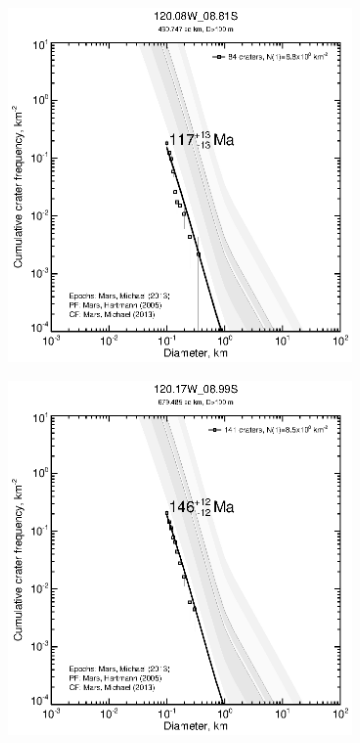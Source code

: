 \documentclass[12pt,letter]{article}
\begin{document}
\begin{figure}[h]
\begin{subfigure}{.33\textwidth}
\end{subfigure}
\begin{subfigure}{.33\textwidth}
  \includegraphics[width=\linewidth,clip,trim=1cm 1cm 1.5cm 1cm]{figures/craterstats/120-08W_08-81S_100m_cum.eps}
\end{subfigure}%
\begin{subfigure}{.33\textwidth}
  \includegraphics[width=\linewidth,clip,trim=1cm 1cm 1.5cm 1cm]{figures/craterstats/120-17W_08-99S_100m_cum.eps}

\end{subfigure}
\end{figure}
\end{document}
